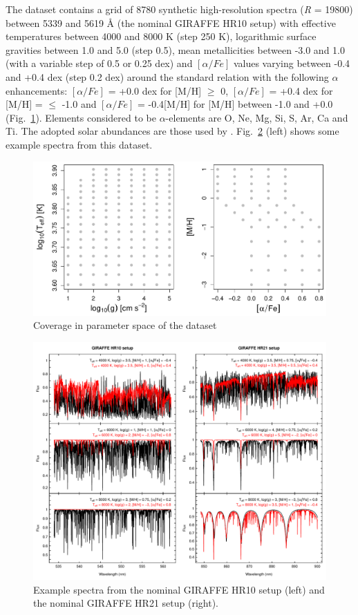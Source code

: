 \documentclass[a4paper,fleqn,usenatbib]{mnras}
\begin{document}
{{{The dataset contains a grid of 8780 synthetic high-resolution spectra 
(\textit{R} = 19800) between 5339 and 5619 {\AA} (the nominal GIRAFFE 
HR10 setup) with effective temperatures between 4000 and 
8000 K (step 250 K), logarithmic surface gravities between 1.0 and 5.0 
(step 0.5), mean metallicities between -3.0 and 1.0 (with a variable step 
of 0.5 or 0.25 dex) and $\left[ \alpha/Fe \right]$ values varying between
-0.4 and +0.4 dex (step 0.2 dex) around the standard relation with the
following $\alpha$ enhancements: $\left[ \alpha/Fe \right]$ = +0.0 dex
for [M/H] $\geqslant$ 0, $\left[ \alpha/Fe \right]$ = +0.4 dex for
[M/H] = $\leqslant$ -1.0 and $\left[ \alpha/Fe \right]$ = -0.4[M/H]
for [M/H] between -1.0 and +0.0 (Fig.~\ref{fig:gridModelos}).
Elements considered to be $\alpha$-elements are O, Ne, Mg, Si, S, Ar,
Ca and Ti. The adopted solar abundances are those used by
\citep{gustafsson:08}. Fig.~\ref{fig:ejemplosEspectros} (left) shows some
example spectra from this dataset.   

\begin{figure}
\centering\includegraphics[width=\columnwidth]{fig01_grid_modelos.pdf}
\caption{Coverage in parameter space of the dataset}
\label{fig:gridModelos}
\end{figure}

\begin{figure}
\centering\includegraphics[width=\textwidth]{fig02_espectros_HR10_HR21.pdf}
\caption{Example spectra from the nominal GIRAFFE 
HR10 setup (left) and the nominal GIRAFFE HR21 setup (right).}
\label{fig:ejemplosEspectros}
\end{figure}

}}}
\end{document}
